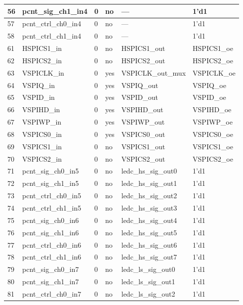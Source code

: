 \begin{longtable}[c]{|p{1cm}|p{3.8cm}|p{2.0cm}|p{2.9cm}|p{4.8cm}|p{3.0cm}| }
    56 & pcnt\_sig\_ch1\_in4 & 0 & no &  --- & 1'd1 \\ \hline
    57 & pcnt\_ctrl\_ch0\_in4 & 0 & no & --- & 1'd1 \\ \hline
    58 & pcnt\_ctrl\_ch1\_in4 & 0 & no & --- & 1'd1 \\ \hline
    61 & HSPICS1\_in & 0 & no & HSPICS1\_out & HSPICS1\_oe \\ \hline
    62 & HSPICS2\_in & 0 & no & HSPICS2\_out & HSPICS2\_oe \\ \hline
    63 & VSPICLK\_in & 0 & yes & VSPICLK\_out\_mux & VSPICLK\_oe \\ \hline
    64 & VSPIQ\_in & 0 & yes & VSPIQ\_out & VSPIQ\_oe \\ \hline
    65 & VSPID\_in & 0 & yes & VSPID\_out & VSPID\_oe \\ \hline
    66 & VSPIHD\_in & 0 & yes & VSPIHD\_out & VSPIHD\_oe \\ \hline
    67 & VSPIWP\_in & 0 & yes & VSPIWP\_out & VSPIWP\_oe \\ \hline
    68 & VSPICS0\_in & 0 & yes & VSPICS0\_out & VSPICS0\_oe \\ \hline
    69 & VSPICS1\_in & 0 & no & VSPICS1\_out & VSPICS1\_oe \\ \hline
    70 & VSPICS2\_in & 0 & no & VSPICS2\_out & VSPICS2\_oe \\ \hline
    71 & pcnt\_sig\_ch0\_in5 & 0 & no & ledc\_hs\_sig\_out0 & 1'd1 \\ \hline
    72 & pcnt\_sig\_ch1\_in5 & 0 & no & ledc\_hs\_sig\_out1 & 1'd1 \\ \hline
    73 & pcnt\_ctrl\_ch0\_in5 & 0 & no & ledc\_hs\_sig\_out2 & 1'd1 \\ \hline
    74 & pcnt\_ctrl\_ch1\_in5 & 0 & no & ledc\_hs\_sig\_out3 & 1'd1 \\ \hline
    75 & pcnt\_sig\_ch0\_in6 & 0 & no & ledc\_hs\_sig\_out4 & 1'd1 \\ \hline
    76 & pcnt\_sig\_ch1\_in6 & 0 & no & ledc\_hs\_sig\_out5 & 1'd1 \\ \hline
    77 & pcnt\_ctrl\_ch0\_in6 & 0 & no & ledc\_hs\_sig\_out6 & 1'd1 \\ \hline
    78 & pcnt\_ctrl\_ch1\_in6 & 0 & no & ledc\_hs\_sig\_out7 & 1'd1 \\ \hline
    79 & pcnt\_sig\_ch0\_in7 & 0 & no & ledc\_ls\_sig\_out0 & 1'd1 \\ \hline
    80 & pcnt\_sig\_ch1\_in7 & 0 & no & ledc\_ls\_sig\_out1 & 1'd1 \\ \hline
    81 & pcnt\_ctrl\_ch0\_in7 & 0 & no & ledc\_ls\_sig\_out2 & 1'd1 \\ \hline

\end{longtable}
